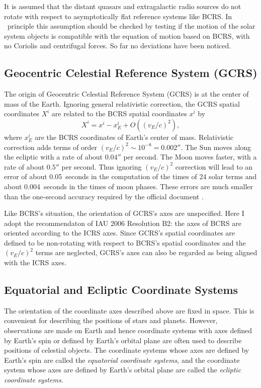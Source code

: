 \documentclass[12pt]{article}
\newcommand \beq {\begin{equation}}
\newcommand \eeq {\end{equation}}
\begin{document}
\begin{CJK}{UTF8}{bkai}
It is assumed that the distant quasars and extragalactic radio sources do not 
rotate with respect to asymptotically flat reference systems like BCRS. In \
principle this assumption should be checked by testing if the motion of 
the solar system objects is compatible with the equation of motion based 
on BCRS, with no Coriolis and centrifugal forces. So far no deviations have been 
noticed. 

\subsection{Geocentric Celestial Reference System (GCRS)}

The origin of Geocentric Celestial Reference System (GCRS) is at the 
center of mass of the Earth. 
Ignoring general relativistic correction, the GCRS spatial coordinates $X^i$ 
are related to the BCRS spatial coordinates $x^i$ by 
\beq
  X^i = x^i - x^i_E + O((v_E/c)^2) ,
\label{eq:GCRSX}
\eeq
where $x^i_E$ are the BCRS coordinates of Earth's center of mass. Relativistic 
correction adds terms of order $(v_E/c)^2 \sim 10^{-8}=0.002''$. The Sun moves 
along the ecliptic with a rate of about $0.04''$ per second. The Moon moves 
faster, with a rate of about $0.5''$ per second. Thus ignoring $(v_E/c)^2$ 
correction will lead to an error of about 0.05~seconds in the computation of the 
times of 24 solar terms and about 0.004~seconds in the times of moon phases. 
These errors are much smaller than the one-second accuracy required by the 
official document \cite{pmo17}.

Like BCRS's situation, the orientation of GCRS's axes are unspecified. 
Here I adopt the recommendaton of IAU 2006 Resolution B2: the axes of BCRS 
are oriented according to the ICRS axes. Since GCRS's spatial coordinates 
are defined to be non-rotating with respect to BCRS's spatial coordinates 
and the $(v_E/c)^2$ terms are neglected, 
GCRS's axes can also be regarded as being aligned with the ICRS axes.

\subsection{Equatorial and Ecliptic Coordinate Systems}

The orientation of the coordinate axes described above 
are fixed in space. This is convenient for describing the positions of
stars and planets. However, observations are made on Earth and hence 
coordinate systems with axes defined by Earth's spin or defined by Earth's orbital plane
are often used to describe positions of celestial objects. 
The coordinate systems whose axes are defined by Earth's spin are called 
the {\em equatorial coordinate systems}, and the coordinate system whose axes 
are defined by Earth's orbital plane are called the {\em ecliptic coordinate 
systems}.



\end{CJK}
\end{document}
